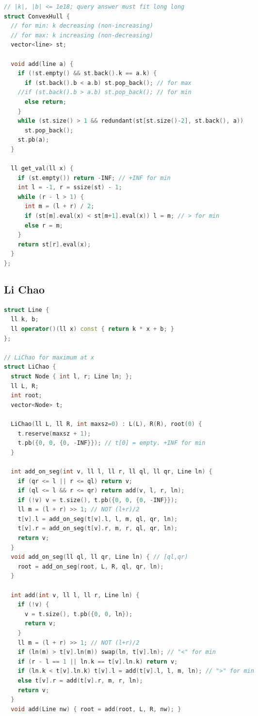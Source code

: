 \documentclass[8pt,a4paper,landscape,twosided]{extarticle}
\begin{document}
\begin{multicols*}{3}
\begin{lstlisting}[language=C++]
// |k|, |b| <= 1e18; query answer must fit long long
struct ConvexHull {
  // for min: k decreasing (non-increasing)
  // for max: k increasing (non-decreasing)
  vector<line> st;

  void add(line a) {
    if (!st.empty() && st.back().k == a.k) {
      if (st.back().b < a.b) st.pop_back(); // for max
    //if (st.back().b > a.b) st.pop_back(); // for min
      else return;
    }
    while (st.size() > 1 && redundant(st[st.size()-2], st.back(), a))
      st.pop_back();
    st.pb(a);
  }

  ll get_val(ll x) {
    if (st.empty()) return -INF; // +INF for min
    int l = -1, r = ssize(st) - 1;
    while (r - l > 1) {
      int m = (l + r) / 2;
      if (st[m].eval(x) < st[m+1].eval(x)) l = m; // > for min
      else r = m;
    }
    return st[r].eval(x);
  }
};
\end{lstlisting}

\subsection{Li Chao}
\begin{lstlisting}[language=C++]
struct Line {
  ll k, b;
  ll operator()(ll x) const { return k * x + b; }
};

// LiChao for maximum at x
struct LiChao {
  struct Node { int l, r; Line ln; };
  ll L, R;
  int root;
  vector<Node> t;

  LiChao(ll L, ll R, int maxsz=0) : L(L), R(R), root(0) {
    t.reserve(maxsz + 1);
    t.pb({0, 0, {0, -INF}}); // t[0] = empty. +INF for min
  }

  int add_on_seg(int v, ll l, ll r, ll ql, ll qr, Line ln) {
    if (qr <= l || r <= ql) return v;
    if (ql <= l && r <= qr) return add(v, l, r, ln);
    if (!v) v = t.size(), t.pb({0, 0, {0, -INF}});
    ll m = (l + r) >> 1; // NOT (l+r)/2
    t[v].l = add_on_seg(t[v].l, l, m, ql, qr, ln);
    t[v].r = add_on_seg(t[v].r, m, r, ql, qr, ln);
    return v;
  }
  void add_on_seg(ll ql, ll qr, Line ln) { // [ql,qr)
    root = add_on_seg(root, L, R, ql, qr, ln);
  }

  int add(int v, ll l, ll r, Line ln) {
    if (!v) {
      v = t.size(), t.pb({0, 0, ln});
      return v;
    }
    ll m = (l + r) >> 1; // NOT (l+r)/2
    if (ln(m) > t[v].ln(m)) swap(ln, t[v].ln); // "<" for min
    if (r - l == 1 || ln.k == t[v].ln.k) return v;
    if (ln.k < t[v].ln.k) t[v].l = add(t[v].l, l, m, ln); // ">" for min
    else t[v].r = add(t[v].r, m, r, ln);
    return v;
  }
  void add(Line nw) { root = add(root, L, R, nw); }


\end{lstlisting}
\end{multicols*}
\end{document}
